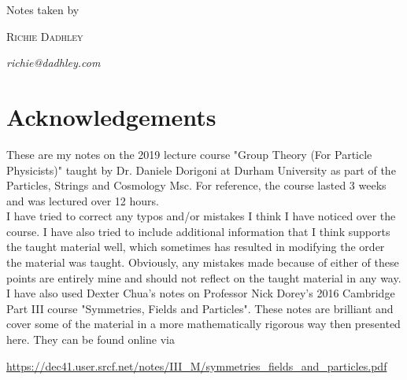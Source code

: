 \documentclass[11pt,oneside]{book}
\theoremstyle{definition} %
\theoremstyle{plain} %
\theoremstyle{remark} %
\theoremstyle{underline}
\begin{document}
\begin{titlepage}
	    \vspace{3\baselineskip}

	    Notes taken by 
	
	    \vspace{0.5\baselineskip} %
	
	    {\scshape\Large Richie Dadhley} %
	   
	    \vspace{0.5\baselineskip} %
	    \textit{richie@dadhley.com} %
	
	    \vfill %
\end{titlepage}




\newpage
\section*{Acknowledgements}

These are my notes on the 2019 lecture course "Group Theory (For Particle Physicists)" taught by Dr. Daniele Dorigoni at Durham University as part of the Particles, Strings and Cosmology Msc. For reference, the course lasted 3 weeks and was lectured over 12 hours. \\

I have tried to correct any typos and/or mistakes I think I have noticed over the course. I have also tried to include additional information that I think supports the taught material well, which sometimes has resulted in modifying the order the material was taught. Obviously, any mistakes made because of either of these points are entirely mine and should not reflect on the taught material in any way. \\

I have also used Dexter Chua's notes on Professor Nick Dorey's 2016 Cambridge Part III course "Symmetries, Fields and Particles". These notes are brilliant and cover some of the material in a more mathematically rigorous way then presented here. They can be found online via 

\begin{center}
    \href{https://dec41.user.srcf.net/notes/III_M/symmetries_fields_and_particles.pdf}{https://dec41.user.srcf.net/notes/III\_M/symmetries\_fields\_and\_particles.pdf}
\end{center}
\end{document}
